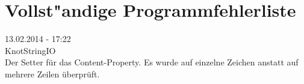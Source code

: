 %



\section{Vollst{"a}ndige Programmfehlerliste}
\label{Anhang:Vollstaendige_Fehlerliste}




13.02.2014 - 17:22\\

KnotStringIO\\

Der Setter für das Content-Property.
Es wurde auf einzelne Zeichen anstatt auf mehrere Zeilen überprüft.



